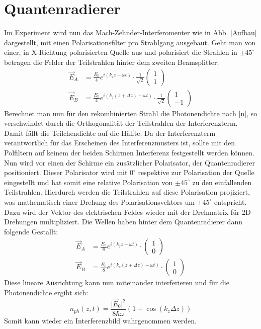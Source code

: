 \documentclass{include/thesisclass3}
\begin{document}
\section{Quantenradierer}
Im Experiment wird nun das Mach-Zehnder-Interferomenter wie in Abb. \ref{Aufbau} dargestellt, mit einen Polarisationsfilter pro Strahlgang ausgebaut. Geht man von einer, in X-Richtung polarisierten Quelle aus und polarisiert die Strahlen in $\pm 45^\circ$ betragen die Felder der Teilstrahlen hinter dem zweiten Beamsplitter:
\begin{align}
\vec{E}_A&=\frac{E_0}{4}e^{i(k_z z - \omega t)} \cdot\frac{1}{\sqrt{2}}\left(\begin{array}{c} 1 \\ 1 \end{array}\right)\\
\vec{E}_B&=\frac{E_0}{4}e^{i(k_z (z+\Delta z) - \omega t)}\cdot \frac{1}{\sqrt{2}}\left(\begin{array}{c} 1 \\ -1 \end{array}\right)
\end{align}
Berechnet man nun für den rekombinierten Strahl die Photonendichte nach \ref{n}, so verschwindet durch die Orthogonalität der Teilstrahlen der Interferenzterm. Damit fällt die Teilchendichte auf die Hälfte. Da der Interferenzterm verantwortlich für das Erscheinen des Interferenzmusters ist, sollte mit den Polfiltern auf keinem der beiden Schirmen Interferenz festgestellt werden können.\\
Nun wird vor einen der Schirme ein zusätzlicher Polarisator, der Quantenradierer positioniert. Dieser Polarisator wird mit $0^\circ$ respektive zur Polarisation der Quelle eingestellt und hat somit eine relative Polarisation von $\pm 45^{\circ}$ zu den einfallenden Teilstrahlen. Hierdurch werden die Teilstrahlen auf diese Polarisation projiziert, was mathematisch einer Drehung des Polarisationsvektors um $\pm 45^{\circ}$ entspricht. Dazu wird der Vektor des elektrischen Feldes wieder mit der Drehmatrix für 2D-Drehungen multipliziert. Die Wellen haben hinter dem Quantenradierer dann folgende Gestallt:
\begin{align}
\vec{E}_A&=\frac{E_0}{8}e^{i(k_z z - \omega t)} \cdot\left(\begin{array}{c} 1 \\ 0 \end{array}\right)\\
\vec{E}_B&=\frac{E_0}{8}e^{i(k_z (z+\Delta z) - \omega t)}\cdot \left(\begin{array}{c} 1 \\ 0 \end{array}\right)
\end{align}
Diese lineare Ausrichtung kann nun miteinander interferieren und für die Photonendichte ergibt sich:
\begin{equation}
n_{ph}(z,t)=\frac{\vert \vec{E}_0\vert ^2}{8\hbar\omega}(1+\cos(k_z\Delta z))
\end{equation}
Somit kann wieder ein Interferenzbild wahrgenommen werden.
\end{document}

